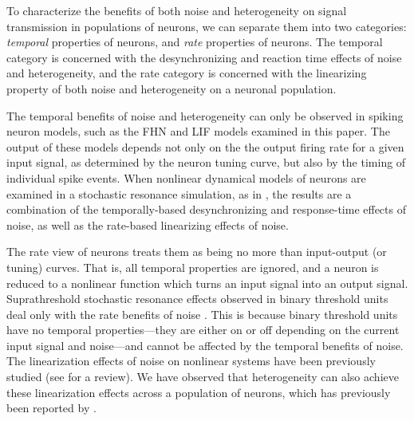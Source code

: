 \documentclass[12pt]{article}
\begin{document}
To characterize the benefits of both noise and heterogeneity on signal transmission in populations of neurons, we can separate them into two categories: \emph{temporal} properties of neurons, and \emph{rate} properties of neurons. The temporal category is concerned with the desynchronizing and reaction time effects of noise and heterogeneity, and the rate category is concerned with the linearizing property of both noise and heterogeneity on a neuronal population.

The temporal benefits of noise and heterogeneity can only be observed in spiking neuron models, such as the FHN and LIF models examined in this paper. The output of these models depends not only on the the output firing rate for a given input signal, as determined by the neuron tuning curve, but also by the timing of individual spike events. When nonlinear dynamical models of neurons are examined in a stochastic resonance simulation, as in \cite{Stocks2001}, the results are a combination of the temporally-based desynchronizing and response-time effects of noise, as well as the rate-based linearizing effects of noise.

The rate view of neurons treats them as being no more than input-output (or tuning) curves. That is, all temporal properties are ignored, and a neuron is reduced to a nonlinear function which turns an input signal into an output signal. Suprathreshold stochastic resonance effects observed in binary threshold units deal only with the rate benefits of noise \citep{Stocks2000,Stocks2001a,McDonnell2006}. This is because binary threshold units have no temporal properties---they are either on or off depending on the current input signal and noise---and cannot be affected by the temporal benefits of noise. The linearization effects of noise on nonlinear systems have been previously studied (see \cite{Stocks1996} for a review). We have observed that heterogeneity can also achieve these linearization effects across a population of neurons, which has previously been reported by \cite{Eliasmith2003}.
\end{document}
